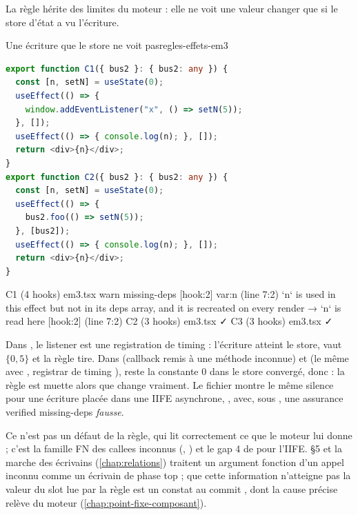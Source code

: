 La règle hérite des limites du moteur : elle ne voit une valeur changer que si le store d'état a vu l'écriture.

\begin{exemple}{Une écriture que le store ne voit pas}{regles-effets-em3}
\begin{lstlisting}[language=TypeScript]
export function C1({ bus2 }: { bus2: any }) {
  const [n, setN] = useState(0);
  useEffect(() => {
    window.addEventListener("x", () => setN(5));
  }, []);
  useEffect(() => { console.log(n); }, []);
  return <div>{n}</div>;
}
export function C2({ bus2 }: { bus2: any }) {
  const [n, setN] = useState(0);
  useEffect(() => {
    bus2.foo(() => setN(5));
  }, [bus2]);
  useEffect(() => { console.log(n); }, []);
  return <div>{n}</div>;
}
\end{lstlisting}
\begin{sortie}
  C1  (4 hooks)  em3.tsx
    warn   missing-deps  [hook:2]  var:n  (line 7:2)  `n` is used in this effect but not in its deps array, and it is recreated on every render
       → `n` is read here [hook:2] (line 7:2)
  C2  (3 hooks)  em3.tsx  ✓
  C3  (3 hooks)  em3.tsx  ✓
\end{sortie}
Dans , le listener  est une registration de timing  : l'écriture  atteint le store,  vaut $\{0, 5\}$ et la règle tire. Dans  (callback remis à une méthode inconnue) et  (le même avec , registrar de timing ),  reste la constante 0 dans le store convergé, donc  : la règle est muette alors que  change vraiment. Le fichier  montre le même silence pour une écriture placée dans une IIFE asynchrone, , avec, sous , une assurance \og verified missing-deps\fg{} \emph{fausse}.
\end{exemple}

Ce n'est pas un défaut de la règle, qui lit correctement ce que le moteur lui donne ; c'est la famille FN des \og callees inconnus\fg{} (, ) et le \og gap 4\fg{} de  pour l'IIFE.  §5 et la marche des écrivains (\cref{chap:relations}) traitent un argument fonction d'un appel inconnu comme un écrivain de phase top ; que cette information n'atteigne pas la valeur du slot lue par la règle est un constat au commit \snapshotCommit, dont la cause précise relève du moteur (\cref{chap:point-fixe-composant}).


